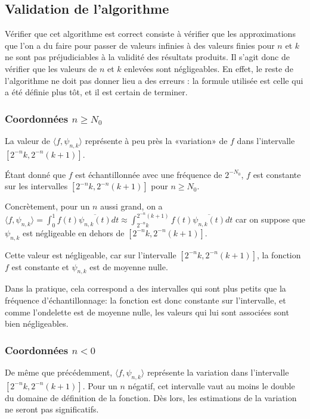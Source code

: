 \subsection{Validation de l'algorithme}

Vérifier que cet algorithme est correct consiste à vérifier que les approximations que l'on a du faire pour passer de valeurs infinies à des valeurs finies pour $n$ et $k$ ne sont pas préjudiciables à la validité des résultats produits. Il s'agit donc de vérifier que les valeurs de $n$ et $k$ enlevées sont négligeables. En effet,  le reste de l'algorithme ne doit pas donner lieu a des erreurs : la formule utilisée est celle qui a été définie plus tôt, et il est certain de terminer. 

\subsubsection{Coordonnées $n\geqslant N_0$}

La valeur de $\langle f,\psi_{n,k}\rangle$ représente à peu près la «variation» de $f$ dans l'intervalle $[2^{-n}k,2^{-n}(k+1)]$.

Étant donné que $f$ est échantillonnée avec une fréquence de $2^{-N_0}$, $f$ est constante sur les intervalles $[2^{-n}k,2^{-n}(k+1)]$ pour $n\geqslant N_0$.

Concrètement, pour un $n$ aussi grand, on a $\langle f,\psi_{n,k}\rangle = \int_0^1 f(t) \overline{\psi_{n, k}(t)}dt \approx \int_{2^{-n}k}^{2^{-n}(k+1)} f(t) \overline{\psi_{n, k}(t)}dt$ car on suppose que $\psi_{n,k}$ est négligeable en dehors de $[2^{-n}k,2^{-n}(k+1)]$.

Cette valeur est négligeable, car sur l'intervalle $[2^{-n}k,2^{-n}(k+1)]$, la fonction $f$ est constante et $\psi_{n,k}$ est de moyenne nulle.

Dans la pratique, cela correspond a des intervalles qui sont plus petits que la fréquence d'échantillonnage: la fonction est donc constante sur l'intervalle, et comme l'ondelette est de moyenne nulle, les valeurs qui lui sont associées sont bien négligeables. 


\subsubsection{Coordonnées $n < 0$}

De même que précédemment, $\langle f,\psi_{n,k}\rangle$ représente la variation dans l'intervalle $[2^{-n}k,2^{-n}(k+1)]$. Pour un $n$ négatif, cet intervalle vaut au moins le double du domaine de définition de la fonction. Dès lors, les estimations de la variation ne seront pas significatifs.



